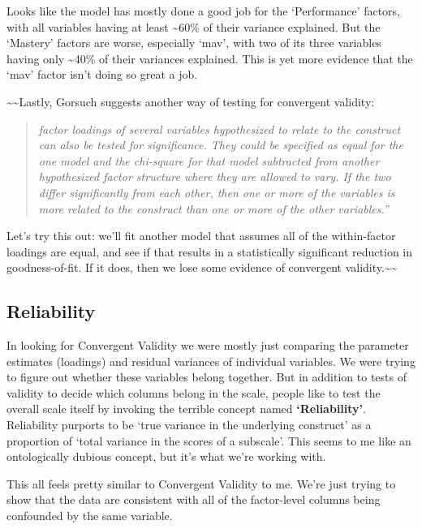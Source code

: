 \documentclass[
  letterpaper,
  DIV=11,
  numbers=noendperiod]{scrreprt}
\begin{document}
Looks like the model has mostly done a good job for the `Performance'
factors, with all variables having at least \textasciitilde60\% of their
variance explained. But the `Mastery' factors are worse, especially
`mav', with two of its three variables having only \textasciitilde40\%
of their variances explained. This is yet more evidence that the `mav'
factor isn't doing so great a job.

\textasciitilde\textasciitilde Lastly, Gorsuch suggests another way of
testing for convergent validity:

\begin{quote}
\emph{factor loadings of several variables hypothesized to relate to the
construct can also be tested for significance. They could be specified
as equal for the one model and the chi-square for that model subtracted
from another hypothesized factor structure where they are allowed to
vary. If the two differ significantly from each other, then one or more
of the variables is more related to the construct than one or more of
the other variables.''}
\end{quote}

Let's try this out: we'll fit another model that assumes all of the
within-factor loadings are equal, and see if that results in a
statistically significant reduction in goodness-of-fit. If it does, then
we lose some evidence of convergent
validity.\textasciitilde\textasciitilde{}

\hypertarget{reliability}{%
\subsection*{Reliability}\label{reliability}}

In looking for Convergent Validity we were mostly just comparing the
parameter estimates (loadings) and residual variances of individual
variables. We were trying to figure out whether these variables belong
together. But in addition to tests of validity to decide which columns
belong in the scale, people like to test the overall scale itself by
invoking the terrible concept named \textbf{`Reliability'}. Reliability
purports to be `true variance in the underlying construct' as a
proportion of `total variance in the scores of a subscale'. This seems
to me like an ontologically dubious concept, but it's what we're working
with.

This all feels pretty similar to Convergent Validity to me. We're just
trying to show that the data are consistent with all of the factor-level
columns being confounded by the same variable.
\end{document}
